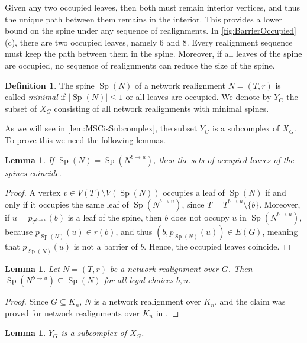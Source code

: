 \documentclass[reqno,dvipsnames]{amsart}
\theoremstyle{plain}
\newtheorem{lemma}[theorem]{Lemma}
\numberwithin{equation}{section}
\theoremstyle{definition}
\newtheorem{definition}[theorem]{Definition}
\DeclareMathOperator{\Sp}{Sp}
\begin{document}
Given any two occupied leaves, then both must remain interior vertices, and thus the unique path between them remains in the interior. This provides a lower bound on the spine under any sequence of realignments. In \autoref{fig:BarrierOccupied} (c), there are two occupied leaves, namely 6 and 8. Every realignment sequence must keep the path between them in the spine. Moreover, if all leaves of the spine are occupied, no sequence of realignments can reduce the size of the spine.

\begin{definition}
	The spine $\Sp(N)$ of a network realignment $N=(T,r)$ is called \textit{minimal} if $|\Sp(N)|\leq 1$ or all leaves are occupied. We denote by $Y_G$ the subset of $X_G$ consisting of all network realignments with minimal spines.
\end{definition}

As we will see in \autoref{lem:MSCisSubcomplex}, the subset $Y_G$ is a subcomplex of $X_G$. To prove this we need the following lemmas. 

\begin{lemma} \label{lem:OccupiedLeaves}
	If $\Sp(N) = \Sp(N^{b\to u})$, then the sets of occupied leaves of the spines coincide.
\end{lemma}

\begin{proof}
	A vertex $v\in V(T)\setminus V(\Sp(N))$ occupies a leaf of $\Sp(N)$ if and only if it occupies the same leaf of $\Sp(N^{b\to u})$, since $T= T^{b\to u} \setminus \{b\}$. Moreover, if $u = p_{T^{b\to u}} (b)$ is a leaf of the spine, then $b$ does not occupy $u$ in $\Sp(N^{b\to u})$, because $p_{\Sp(N)}(u)\in r(b)$, and thus $(b, p_{\Sp(N)} (u))\in E(G)$, meaning that $p_{\Sp(N)}(u)$ is not a barrier of $b$. Hence, the occupied leaves coincide.
\end{proof}

\begin{lemma}\label{lem:SpineInclusion}
	Let $N = (T,r)$ be a network realignment over $G$. Then $\Sp(N^{b\to u}) \subseteq \Sp(N)$ for all legal choices $b,u$.
\end{lemma}

\begin{proof}
	Since $G\subseteq K_n$, $N$ is a network realignment over $K_n$, and the claim was proved for network realignments over $K_n$ in \cite[Proposition 4.7]{Kozlov25}.  
\end{proof}

\begin{lemma}\label{lem:MSCisSubcomplex}
	$Y_G$ is a subcomplex of $X_G$. 
\end{lemma}
\end{document}

